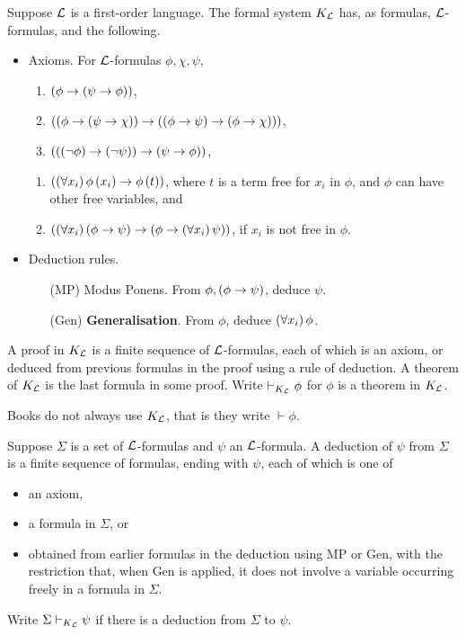 \begin{definition}
Suppose $ \mathcal{L} $ is a first-order language. The formal system $ K_{\mathcal{L}} $ has, as formulas, $ \mathcal{L} $-formulas, and the following.
\begin{itemize}
\item Axioms. For $ \mathcal{L} $-formulas $ \phi, \chi, \psi $,
\begin{enumerate}[label=(A\arabic*)]
\item $ \left( \phi \rightarrow \left( \psi \rightarrow \phi \right) \right) $,
\item $ \left( \left( \phi \rightarrow \left( \psi \rightarrow \chi \right) \right) \rightarrow \left( \left( \phi \rightarrow \psi \right) \rightarrow \left( \phi \rightarrow \chi \right) \right) \right) $,
\item $ \left( \left( \left( \neg \phi \right) \rightarrow \left( \neg \psi \right) \right) \rightarrow \left( \psi \rightarrow \phi \right) \right) $,
\end{enumerate}
\begin{enumerate}[label=(K\arabic*)]
\item $ \left( \left( \forall x_i \right)\phi\left( x_i \right) \rightarrow \phi\left( t \right) \right) $, where $ t $ is a term free for $ x_i $ in $ \phi $, and $ \phi $ can have other free variables, and
\item $ \left( \left( \forall x_i \right)\left( \phi \rightarrow \psi \right) \rightarrow \left( \phi \rightarrow \left( \forall x_i \right)\psi \right) \right) $, if $ x_i $ is not free in $ \phi $.
\end{enumerate}
\item Deduction rules.
\begin{itemize}
\item[(MP)] Modus Ponens. From $ \phi, \left( \phi \rightarrow \psi \right) $, deduce $ \psi $.
\item[(Gen)] \textbf{Generalisation}. From $ \phi $, deduce $ \left( \forall x_i \right)\phi $.
\end{itemize}
\end{itemize}
A proof in $ K_{\mathcal{L}} $ is a finite sequence of $ \mathcal{L} $-formulas, each of which is an axiom, or deduced from previous formulas in the proof using a rule of deduction. A theorem of $ K_{\mathcal{L}} $ is the last formula in some proof. Write $ \vdash_{K_{\mathcal{L}}} \phi $ for $ \phi $ is a theorem in $ K_{\mathcal{L}} $.
\end{definition}

\begin{note}
Books do not always use $ K_{\mathcal{L}} $, that is they write $ \vdash \phi $.
\end{note}

\pagebreak

\begin{definition}
Suppose $ \Sigma $ is a set of $ \mathcal{L} $-formulas and $ \psi $ an $ \mathcal{L} $-formula. A deduction of $ \psi $ from $ \Sigma $ is a finite sequence of formulas, ending with $ \psi $, each of which is one of
\begin{itemize}
\item an axiom,
\item a formula in $ \Sigma $, or
\item obtained from earlier formulas in the deduction using MP or Gen, with the restriction that, when Gen is applied, it does not involve a variable occurring freely in a formula in $ \Sigma $.
\end{itemize}
Write $ \Sigma \vdash_{K_{\mathcal{L}}} \psi $ if there is a deduction from $ \Sigma $ to $ \psi $.
\end{definition}

